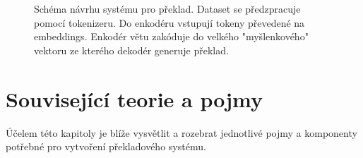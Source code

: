 \begin{figure}[h]
    \begin{center}
    \end{center}
	\caption{Schéma návrhu systému pro překlad. Dataset se předzpracuje pomocí tokenizeru. Do enkodéru vstupují tokeny převedené na embeddings. Enkodér větu zakóduje do velkého "myšlenkového" vektoru ze kterého dekodér generuje překlad.}
	\label{img:draft}
\end{figure}


\chapter{Související teorie a pojmy}\label{chapter:theory}
Účelem této kapitoly je blíže vysvětlit a rozebrat jednotlivé pojmy a komponenty potřebné pro vytvoření překladového systému.



